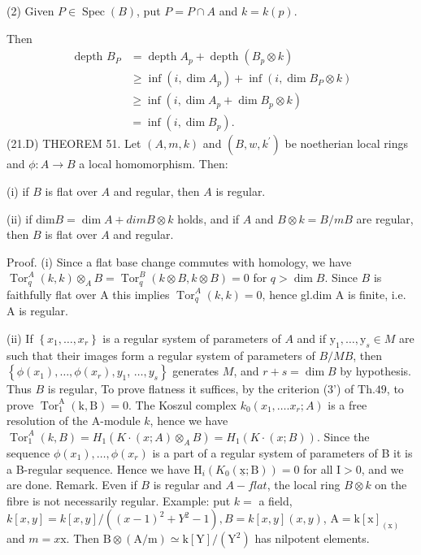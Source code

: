 (2) Given $P \in \operatorname{Spec}(B)$, put $P=P \cap A$ and $k=k(p)$.

Then
$$
\begin{aligned}
\text { depth } B_{P} &=\operatorname{depth} A_{p}+\operatorname{depth}\left(B_{p} \otimes k\right) \\
& \geqslant \inf \left(i, \operatorname{dim} A_{p}\right)+\inf \left(i, \operatorname{dim} B_{P} \otimes k\right)
\end{aligned}
$$
$$
\begin{aligned}
&\geqslant \inf \left(i, \operatorname{dim} A_{p}+\operatorname{dim} B_{p} \otimes k\right) \\
&=\inf \left(i, \operatorname{dim} B_{p}\right) .
\end{aligned}
$$
(21.D) THEOREM 51. Let $(A, m, k)$ and $\left(B, w, k^{\prime}\right)$ be noetherian local rings and $\phi: A \rightarrow B$ a local homomorphism. Then:

(i) if $B$ is flat over $A$ and regular, then $A$ is regular.

(ii) if $\mathrm{dim} B=\operatorname{dim} A+d i m B \otimes k$ holds, and if $A$ and $B \otimes k=B / m B$ are regular, then $B$ is flat over $A$ and regular.

Proof. (i) Since a flat base change commutes with homology, we have $\operatorname{Tor}_{q}^{A}(k, k) \otimes_{A} B=\operatorname{Tor}_{q}^{B}(k \otimes B, k \otimes B)=0$ for $q>\operatorname{dim} B$. Since $B$ is faithfully flat over A this implies $\operatorname{Tor}_{q}^{A}(k, k)=0$, hence gl.dim A is finite, i.e. A is regular.

(ii) If $\left\{x_{1}, \ldots, x_{r}\right\}$ is a regular system of parameters of $A$ and if $\mathrm{y}_{1}, \ldots, \mathrm{y}_{s} \in M$ are such that their images form a regular system of parameters of $B / M B$, then $\left\{\phi\left(x_{1}\right), \ldots, \phi\left(x_{r}\right), y_{1}\right.$, $\left.\ldots, y_{s}\right\}$ generates $M$, and $r+s=\operatorname{dim} B$ by hypothesis. Thus $B$ is regular, To prove flatness it suffices, by the criterion (3') of $\mathrm{Th} .49$, to prove $\operatorname{Tor}_{1}^{\mathrm{A}}(\mathrm{k}, \mathrm{B})=0$. The Koszul complex $k_{0}\left(x_{1}, \ldots . x_{r} ; A\right)$ is a free resolution of the A-module $k$, hence we have $\operatorname{Tor}_{1}^{A}(k, B)=H_{1}\left(K \cdot(x ; A) \otimes_{A} B\right)=H_{1}(K \cdot(x ; B))$. Since the sequence $\phi\left(x_{1}\right), \ldots, \phi\left(x_{r}\right)$ is a part of a regular system of parameters of B it is a B-regular sequence. Hence we have $\mathrm{H}_{i}\left(K_{0}(\underline{\mathrm{x}} ; \mathrm{B})\right)=0$ for all $\mathrm{I}>0$, and we are done. Remark. Even if $B$ is regular and $A-f l a t$, the local ring $B \otimes k$ on the fibre is not necessarily regular. Example: put $k=$ a field, $k[x, y]=k[x, y] /\left((x-1)^{2}+Y^{2}-1\right), B=k[x, y](x, y)$, $\mathrm{A}=\mathrm{k}[\mathrm{x}]_{(\mathrm{x})}$ and $m=x \mathrm{x}$. Then $\mathrm{B} \otimes(\mathrm{A} / \mathrm{m}) \simeq \mathrm{k}[\mathrm{Y}] /\left(\mathrm{Y}^{2}\right)$ has nilpotent elements.

